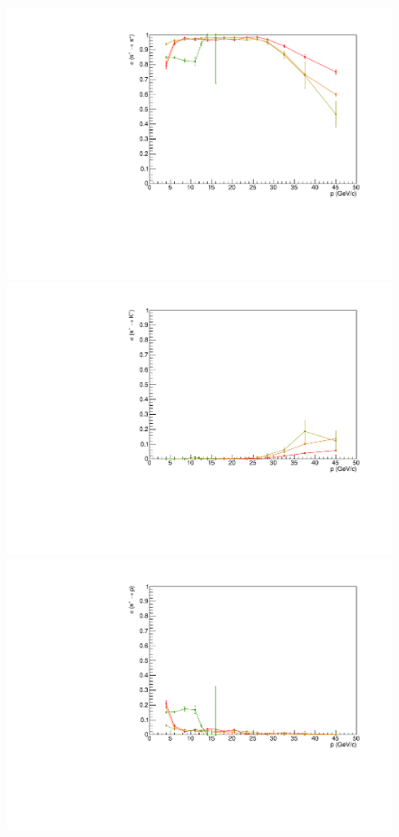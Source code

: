 \begin{figure}[!p]
  \centering
	\includegraphics[scale=0.38]{./gfx/pip_pi.pdf}
  \includegraphics[scale=0.38]{./gfx/pip_K.pdf}
  \includegraphics[scale=0.38]{./gfx/pip_p.pdf}

\end{figure}
